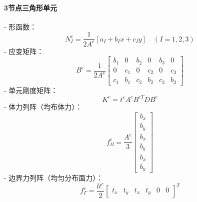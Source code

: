 \documentclass{article}
\begin{document}
\paragraph{3节点三角形单元}
- 形函数：
  \[
  N_{I}^{e} = \frac{1}{2 A^{e}}\left[a_{I} + b_{I} x + c_{I} y\right] \quad (I=1,2,3)
  \]
- 应变矩阵：
  \[
  B^{e} = \frac{1}{2 A^{e}}\left[\begin{array}{cccccc}b_{1} & 0 & b_{2} & 0 & b_{3} & 0 \\ 0 & c_{1} & 0 & c_{2} & 0 & c_{3} \\ c_{1} & b_{1} & c_{2} & b_{2} & c_{3} & b_{3}\end{array}\right]
  \]
- 单元刚度矩阵：
  \[
  K^{e} = t^{e} A^{e} B^{e T} D B^{e}
  \]
- 体力列阵（均布体力）：
  \[
  f_{\Omega}^{e} = \frac{A^{e}}{3}\left[\begin{array}{c}b_{x} \\ b_{y} \\ b_{x} \\ b_{y} \\ b_{x} \\ b_{y}\end{array}\right]
  \]
- 边界力列阵（均匀分布面力）：
  \[
  f_{\Gamma}^{e} = \frac{l t^{e}}{2}\left[\begin{array}{llllll}t_{x} & t_{y} & t_{x} & t_{y} & 0 & 0\end{array}\right]^{T}
  \]
\end{document}
